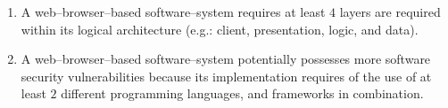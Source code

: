 \documentclass[a4paper, 10pt]{article}
\newcommand{\webbrowserbased}{web--browser--based\xspace}
\begin{document}
\begin{multicols}{2}
\begin{enumerate}[1)]
	\item A \webbrowserbased software--system
		requires at least $4$ layers are
		required within its logical architecture
		(e.g.: client, presentation, logic, and data).

	\item A \webbrowserbased software--system
		potentially possesses more software
		security vulnerabilities because its
		implementation requires of the use of
		at least $2$ different programming 
		languages, and frameworks in combination.
\end{enumerate}






\end{multicols}
\end{document}
